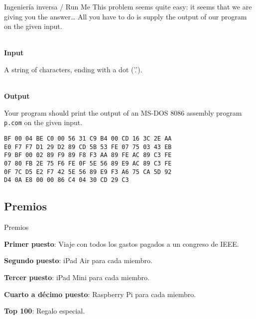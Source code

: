 \begin{frame}[fragile]{Ingeniería inversa / Run Me}
    This problem seems quite easy: it seems that we are giving you the answer…
    All you have to do is supply the output of our program on the given input. \\~
    
    \textbf{Input}

    A string of characters, ending with a dot ('.'). \\~
    
    \textbf{Output}

    Your program should print the output of an MS-DOS 8086 assembly program
    \texttt{p.com} on the given input.
    
    \begin{lstlisting}
BF 00 04 BE C0 00 56 31 C9 B4 00 CD 16 3C 2E AA
E0 F7 F7 D1 29 D2 89 CD 5B 53 FE 07 75 03 43 EB
F9 BF 00 02 89 F9 89 F8 F3 AA 89 FE AC 89 C3 FE
07 80 FB 2E 75 F6 FE 0F 5E 56 89 E9 AC 89 C3 FE
0F 7C D5 E2 F7 42 5E 56 89 E9 F3 A6 75 CA 5D 92
D4 0A E8 00 00 86 C4 04 30 CD 29 C3
    \end{lstlisting}
\end{frame}

\subsection{Premios}
\begin{frame}{Premios}
    \begin{wideitemize}
        \item \textbf{Primer puesto}: Viaje con todos los gastos pagados a
        un congreso de IEEE.
        
        \item \textbf{Segundo puesto}: iPad Air para cada miembro.
        
        \item \textbf{Tercer puesto}: iPad Mini para cada miembro.
        
        \item \textbf{Cuarto a décimo puesto}: Raspberry Pi para cada miembro.
        
        \item \textbf{Top 100}: Regalo especial. 
    \end{wideitemize}
\end{frame}

